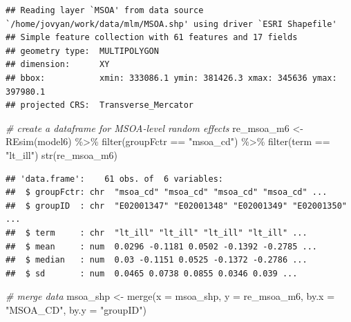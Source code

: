 \documentclass[
]{book}
\newenvironment{Shaded}{\begin{snugshade}}{\end{snugshade}}
\newcommand{\AttributeTok}[1]{\textcolor[rgb]{0.77,0.63,0.00}{#1}}
\newcommand{\CommentTok}[1]{\textcolor[rgb]{0.56,0.35,0.01}{\textit{#1}}}
\newcommand{\FunctionTok}[1]{\textcolor[rgb]{0.00,0.00,0.00}{#1}}
\newcommand{\NormalTok}[1]{#1}
\newcommand{\OtherTok}[1]{\textcolor[rgb]{0.56,0.35,0.01}{#1}}
\newcommand{\SpecialCharTok}[1]{\textcolor[rgb]{0.00,0.00,0.00}{#1}}
\newcommand{\StringTok}[1]{\textcolor[rgb]{0.31,0.60,0.02}{#1}}
\begin{document}
\begin{verbatim}
## Reading layer `MSOA' from data source `/home/jovyan/work/data/mlm/MSOA.shp' using driver `ESRI Shapefile'
## Simple feature collection with 61 features and 17 fields
## geometry type:  MULTIPOLYGON
## dimension:      XY
## bbox:           xmin: 333086.1 ymin: 381426.3 xmax: 345636 ymax: 397980.1
## projected CRS:  Transverse_Mercator
\end{verbatim}

\begin{Shaded}
\begin{Highlighting}[]
\CommentTok{\# create a dataframe for MSOA{-}level random effects}
\NormalTok{re\_msoa\_m6 }\OtherTok{\textless{}{-}} \FunctionTok{REsim}\NormalTok{(model6) }\SpecialCharTok{\%\textgreater{}\%} \FunctionTok{filter}\NormalTok{(groupFctr }\SpecialCharTok{==} \StringTok{"msoa\_cd"}\NormalTok{) }\SpecialCharTok{\%\textgreater{}\%}
  \FunctionTok{filter}\NormalTok{(term }\SpecialCharTok{==} \StringTok{"lt\_ill"}\NormalTok{)}
\FunctionTok{str}\NormalTok{(re\_msoa\_m6)}
\end{Highlighting}
\end{Shaded}

\begin{verbatim}
## 'data.frame':    61 obs. of  6 variables:
##  $ groupFctr: chr  "msoa_cd" "msoa_cd" "msoa_cd" "msoa_cd" ...
##  $ groupID  : chr  "E02001347" "E02001348" "E02001349" "E02001350" ...
##  $ term     : chr  "lt_ill" "lt_ill" "lt_ill" "lt_ill" ...
##  $ mean     : num  0.0296 -0.1181 0.0502 -0.1392 -0.2785 ...
##  $ median   : num  0.03 -0.1151 0.0525 -0.1372 -0.2786 ...
##  $ sd       : num  0.0465 0.0738 0.0855 0.0346 0.039 ...
\end{verbatim}

\begin{Shaded}
\begin{Highlighting}[]
\CommentTok{\# merge data}
\NormalTok{msoa\_shp }\OtherTok{\textless{}{-}} \FunctionTok{merge}\NormalTok{(}\AttributeTok{x =}\NormalTok{ msoa\_shp, }\AttributeTok{y =}\NormalTok{ re\_msoa\_m6, }\AttributeTok{by.x =} \StringTok{"MSOA\_CD"}\NormalTok{, }\AttributeTok{by.y =} \StringTok{"groupID"}\NormalTok{)}
\end{Highlighting}
\end{Shaded}
\end{document}
